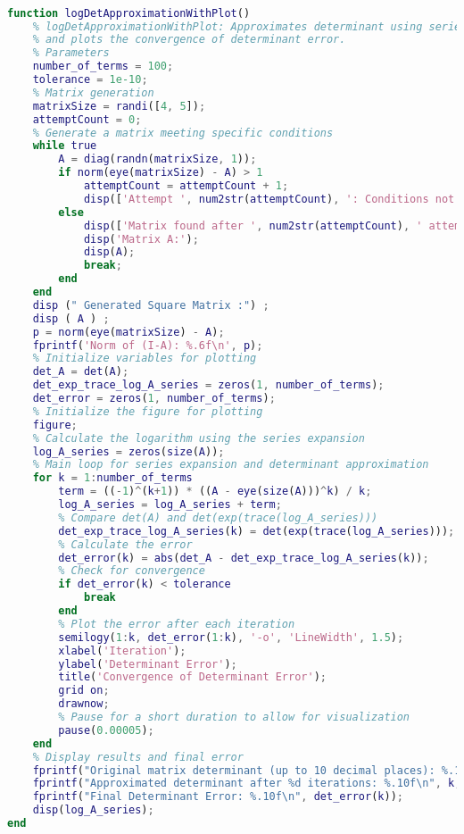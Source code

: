 \begin{sourcecode}\label{sourcecode-determinant}
    \begin{lstlisting}[language=MATLAB]

function logDetApproximationWithPlot()
    % logDetApproximationWithPlot: Approximates determinant using series expansion
    % and plots the convergence of determinant error.
    % Parameters
    number_of_terms = 100;
    tolerance = 1e-10;
    % Matrix generation
    matrixSize = randi([4, 5]);
    attemptCount = 0;
    % Generate a matrix meeting specific conditions
    while true
        A = diag(randn(matrixSize, 1));
        if norm(eye(matrixSize) - A) > 1
            attemptCount = attemptCount + 1;
            disp(['Attempt ', num2str(attemptCount), ': Conditions not met. Trying again...']);
        else
            disp(['Matrix found after ', num2str(attemptCount), ' attempts.']);
            disp('Matrix A:');
            disp(A);
            break;
        end
    end
    disp (" Generated Square Matrix :") ;
    disp ( A ) ;
    p = norm(eye(matrixSize) - A);
    fprintf('Norm of (I-A): %.6f\n', p);
    % Initialize variables for plotting
    det_A = det(A);
    det_exp_trace_log_A_series = zeros(1, number_of_terms);
    det_error = zeros(1, number_of_terms);
    % Initialize the figure for plotting
    figure;
    % Calculate the logarithm using the series expansion
    log_A_series = zeros(size(A));
    % Main loop for series expansion and determinant approximation
    for k = 1:number_of_terms
        term = ((-1)^(k+1)) * ((A - eye(size(A)))^k) / k;
        log_A_series = log_A_series + term;
        % Compare det(A) and det(exp(trace(log_A_series)))
        det_exp_trace_log_A_series(k) = det(exp(trace(log_A_series)));
        % Calculate the error
        det_error(k) = abs(det_A - det_exp_trace_log_A_series(k));
        % Check for convergence
        if det_error(k) < tolerance
            break
        end
        % Plot the error after each iteration
        semilogy(1:k, det_error(1:k), '-o', 'LineWidth', 1.5);
        xlabel('Iteration');
        ylabel('Determinant Error');
        title('Convergence of Determinant Error');
        grid on;
        drawnow;
        % Pause for a short duration to allow for visualization
        pause(0.00005);
    end
    % Display results and final error
    fprintf("Original matrix determinant (up to 10 decimal places): %.10f\n", det_A);
    fprintf("Approximated determinant after %d iterations: %.10f\n", k, det(exp(trace(log_A_series))));
    fprintf("Final Determinant Error: %.10f\n", det_error(k));
    disp(log_A_series);
end
    \end{lstlisting}
\end{sourcecode}
